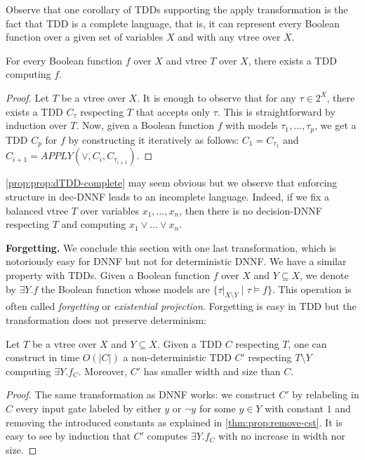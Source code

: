 \documentclass[a4paper,UKenglish,cleveref, autoref, thm-restate]{lipics-v2021}
\newcommand{\guy}[1]{\todo[color=purple]{\color{white}{{\bf Guy}: #1}}}
\begin{document}
\begin{toappendix}
Observe that one corollary of TDDs supporting the apply transformation is the fact that TDD is a complete language, that is, it can represent every Boolean function over a given set of variables $X$ and with any vtree over $X$. 
  \begin{proposition}
    \label{prop:prop:dTDD-complete} For every Boolean function $f$ over $X$ and vtree $T$ over $X$, there exists a TDD computing $f$.
  \end{proposition}
  \begin{proof}
    Let $T$ be a vtree over $X$. It is enough to observe that for any $\tau \in 2^X$, there exists a TDD $C_\tau$ respecting $T$ that accepts only $\tau$. This is straightforward by induction over $T$. Now, given a Boolean function $f$ with models $\tau_1,\dots,\tau_p$, we get a TDD $C_p$ for $f$ by constructing it iteratively as follows: $C_1=C_{\tau_1}$ and $C_{i+1} = APPLY(\vee, C_i, C_{\tau_{i+1}})$.
  \end{proof}

  \cref{prop:prop:dTDD-complete} may seem obvious but we observe that enforcing structure in dec-DNNF leads to an incomplete language. Indeed, if we fix a balanced vtree $T$ over variables $x_1,\dots,x_n$, then there is no decision-DNNF respecting $T$ and computing $x_1\vee \dots \vee x_n$. 

\textbf{Forgetting.} We conclude this section with one last transformation, which is notoriously easy for DNNF but not for deterministic DNNF. We have a similar property with TDDs. Given a Boolean function $f$ over $X$ and $Y \subseteq X$, we denote by $\exists Y. f$ the Boolean function whose models are $\{\tau|_{X \setminus Y} \mid \tau \models f \}$. This operation is often called \emph{forgetting} or \emph{existential projection}. Forgetting is easy in TDD but the transformation does not preserve determinism:

\begin{theorem}
  \label{prop:prop:TDD-forget} Let $T$ be a vtree over $X$ and $Y \subseteq X$. Given a TDD $C$ respecting $T$, one can construct in time $O(|C|)$ a non-deterministic TDD $C'$ respecting $T \setminus Y$ computing $\exists Y. f_C$. Moreover, $C'$ has smaller width and size than $C$.
\end{theorem}
\begin{proof}
  The same transformation as DNNF works: we construct $C'$ by relabeling in $C$ every input gate labeled by either $y$ or $\neg y$ for some $y \in Y$ with constant $1$ and removing the introduced constants as explained in \cref{thm:prop:remove-cst}.  It is easy to see by induction that $C'$ computes $\exists Y.f_C$
  with no increase in width nor size.
\end{proof}



\end{toappendix}
\end{document}
